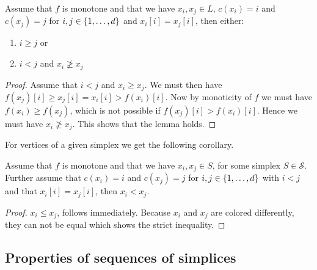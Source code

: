 \begin{lemma}
	\label{lem:monotone_coloring}
	Assume that $f$ is monotone and that we have $x_i, x_j \in L$, $c(x_i) = i$ and $c(x_j) = j$ for $i, j \in \left\{1, \dots, d\right\}$ and $x_i[i] = x_j[i]$, then either:
	\begin{enumerate}
		\item $i \geq j$ or
		\item $i < j$  and $x_i \not\geq x_j$
	\end{enumerate}
\end{lemma}
\begin{proof}
	Assume that $i < j$ and $x_i \geq x_j$. We must then have $f(x_j)[i] \geq x_j[i] = x_i[i] > f(x_i)[i]$. Now by monoticity of $f$ we must have $f(x_i) \geq f(x_j)$, which is not possible if $f(x_j)[i] > f(x_i)[i]$. Hence we must have $x_i \not\geq x_j$. This shows that the lemma holds.
\end{proof}

For vertices of a given simplex we get the following corollary.
\begin{corollary}
	\label{cor:monotone_coloring}
	Assume that $f$ is monotone and that we have $x_i, x_j \in S$, for some simplex $S\in  \mathcal{S}$. Further assume that $c(x_i) = i$ and $c(x_j) = j$ for $i, j \in \left\{1, \dots, d\right\}$ with $i < j$ and that $x_i[i] = x_j[i]$, then $x_i < x_j$.
\end{corollary}
\begin{proof}
	$x_i \leq x_j$, follows immediately. Because $x_i$ and $x_j$ are colored differently, they can not be equal which shows the strict inequality.
\end{proof}
\subsection{Properties of sequences of simplices}

